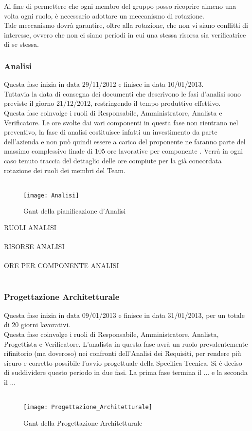 Al fine di permettere che ogni membro del gruppo posso ricoprire almeno una volta ogni ruolo, è necessario adottare un meccanismo di rotazione.\\
Tale meccanismo dovrà garantire, oltre alla rotazione, che non vi siano conflitti di interesse, ovvero che non ci siano periodi in cui una stessa risorsa sia verificatrice di se stessa.\\


\subsubsection{Analisi}
Questa fase inizia in data 29/11/2012 e finisce in data 10/01/2013.\\
Tuttavia la data di consegna dei documenti che descrivono le fasi d'analisi sono previste il giorno 21/12/2012, restringendo il tempo produttivo effettivo.\\
Questa fase coinvolge i ruoli di Responsabile, Amministratore, Analista e Verificatore.
Le ore svolte dai vari componenti in questa fase non rientrano nel preventivo, la fase di analisi costituisce infatti un investimento da parte dell’azienda e non può quindi essere a carico del proponente ne faranno parte del massimo complessivo finale di 105 ore lavorative per componente .
Verrà in ogni caso tenuto traccia del dettaglio delle ore compiute per la già concordata rotazione dei ruoli dei membri del Team. \\\\

\begin{figure}[h]
  \texttt{[image: Analisi]}
\caption{Gant della pianificazione d'Analisi }
\end{figure}

RUOLI ANALISI\\\\

RISORSE ANALISI\\\\

ORE PER COMPONENTE ANALISI\\\\

\subsubsection{Progettazione Architetturale}
Questa fase inizia in data 09/01/2013 e finisce in data 31/01/2013, per un totale di 20 giorni lavorativi. \\
Questa fase coinvolge i ruoli di Responsabile, Amministratore, Analista, Progettista e Verificatore.
L'analista in questa fase avrà un ruolo prevalentemente rifinitorio (ma doveroso) nei confronti dell'Analisi dei Requisiti, per rendere più sicuro e corretto possibile l'avvio progettuale della Specifica Tecnica.
Si è deciso di suddividere questo periodo in due fasi. La prima fase termina il ... e la seconda il ...\\\\
\begin{figure}[h]
  \texttt{[image: Progettazione\_Architetturale]}
\caption{Gant della Progettazione Architetturale }
\end{figure}

